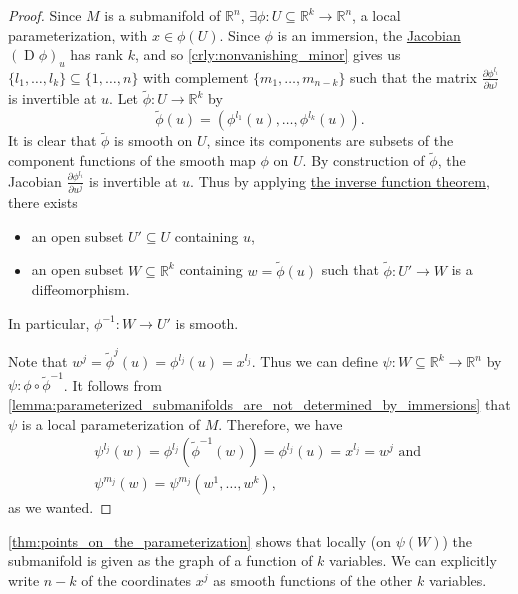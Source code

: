 \documentclass[notoc,notitlepage]{tufte-book}
\DeclareMathOperator{\D}{D}
\begin{document}
\begin{proof}
  Since $M$ is a submanifold of $\mathbb{R}^n$, $\exists \phi : U \subseteq
  \mathbb{R}^k \to \mathbb{R}^n$, a local parameterization, with $x \in \phi(U)$.
  Since $\phi$ is an immersion, the \hyperref[defn:differential]{Jacobian} $(\D
  \phi)_u$ has rank $k$, and so \cref{crly:nonvanishing_minor} gives us $\{ l_1,
  \ldots, l_k \} \subseteq \{ 1, \ldots, n \}$ with complement $\{ m_1,
  \ldots, m_{n - k} \}$ such that the matrix $\frac{\partial \phi^{l_i}}{\partial
  u^j}$ is invertible at $u$. Let $\tilde{\phi} : U \to \mathbb{R}^k$ by
  \begin{equation*}
    \tilde{\phi}(u) = (\phi^{l_1}(u), \ldots, \phi^{l_k}(u)).
  \end{equation*}
  It is clear that $\tilde{\phi}$ is smooth on $U$, since its components are
  subsets of the component functions of the smooth map $\phi$ on $U$. By
  construction of $\tilde{\phi}$, the Jacobian $\frac{\partial
  \phi^{l_i}}{\partial u^j}$ is invertible at $u$. Thus by applying
  \hyperref[thm:inverse_function_theorem]{the inverse function theorem}, there
  exists
  \begin{itemize}
    \item an open subset $U' \subseteq U$ containing $u$,
    \item an open subset $W \subseteq \mathbb{R}^k$ containing $w =
      \tilde{\phi}(u)$ such that $\tilde{\phi} : U' \to W$ is a diffeomorphism.
  \end{itemize}
  In particular, $\phi^{-1} : W \to U'$ is smooth.

  Note that $w^j = \tilde{\phi}^j(u) = \phi^{l_j}(u) = x^{l_j}$. Thus we can
  define $\psi : W \subseteq \mathbb{R}^k \to \mathbb{R}^n$ by $\psi : \phi
  \circ \tilde{\phi}^{-1}$. It follows from
  \cref{lemma:parameterized_submanifolds_are_not_determined_by_immersions} that
  $\psi$ is a local parameterization of $M$. Therefore, we have
  \begin{gather*}
    \psi^{l_j}(w) = \phi^{l_j} ( \tilde{\phi}^{-1}(w) ) = \phi^{l_j}(u) =
    x^{l_j} = w^j \text{ and } \\
    \psi^{m_j}(w) = \psi^{m_j}(w^1, \ldots, w^k),
  \end{gather*}
  as we wanted.
\end{proof}

\begin{note}
  \cref{thm:points_on_the_parameterization} shows that locally (on $\psi(W)$) the
  submanifold is given as the graph of a function of $k$ variables. We can
  explicitly write $n - k$ of the coordinates $x^j$ as smooth functions of the
  other $k$ variables.
\end{note}
\end{document}
